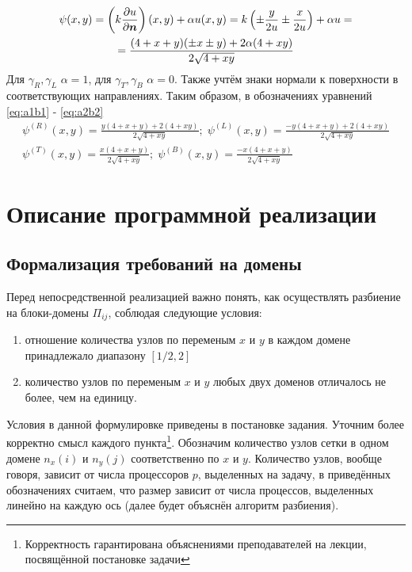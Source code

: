 \documentclass[12pt, fleqn]{article}
\theoremstyle{definition}
\def\vec#1{\mathchoice{\mbox{\boldmath$\displaystyle#1$}}
{\mbox{\boldmath$\textstyle#1$}} {\mbox{\boldmath$\scriptstyle#1$}} {\mbox{\boldmath$\scriptscriptstyle#1$}}}
\begin{document}
\begin{gather*}
 \psi(x, y) = \left(k\frac{\partial u}{\partial \vec{n}}\right)(x, y) + \alpha u(x, y) = k\left(\pm \frac{y}{2u} \pm \frac{x}{2u}\right) + \alpha u = \\
 = \frac{(4+x+y)(\pm x \pm y) + 2\alpha(4+xy)}{2\sqrt{4 + xy}}
\end{gather*}
Для $\gamma_R, \gamma_L$ $\alpha=1$, для $\gamma_T, \gamma_B$ $\alpha=0$. Также учтём знаки нормали к поверхности в соответствующих направлениях.
Таким образом, в обозначениях уравнений \ref{eq:a1b1} - \ref{eq:a2b2}
\begin{gather}
 \psi^{(R)}(x, y) = \frac{y(4+x+y) + 2(4+xy)}{2\sqrt{4 + xy}}; \; \psi^{(L)}(x, y) = \frac{-y(4+x+y) + 2(4+xy)}{2\sqrt{4 + xy}}  \label{eq:psi_RL} \\
 \psi^{(T)}(x, y) = \frac{x(4+x+y)}{2\sqrt{4 + xy}};\;
\psi^{(B)}(x, y) = \frac{-x(4+x+y)}{2\sqrt{4 + xy}}\label{eq:psi_TB}
\end{gather}

\section{Описание программной реализации}
\subsection{Формализация требований на домены}
Перед непосредственной реализацией важно понять, как осуществлять разбиение на блоки-домены $\Pi_{ij}$, соблюдая следующие условия:
\begin{enumerate}
 \item отношение количества узлов по переменым $x$ и $y$ в каждом домене принадлежало диапазону $[1 / 2,2]$

 \item количество узлов по переменым $x$ и $y$ любых двух доменов отличалось не более, чем на единицу.
\end{enumerate}

Условия в данной формулировке приведены в постановке задания. Уточним более корректно смысл каждого пункта\footnote{Корректность гарантирована объяснениями преподавателей на лекции, посвящённой постановке задачи}.
Обозначим количество узлов сетки в одном домене $n_x(i)$ и $n_y(j)$ соответственно по $x$ и $y$. Количество узлов, вообще говоря, зависит от числа процессоров $p$, выделенных на задачу, в приведённых обозначениях считаем, что размер зависит от числа процессов, выделенных линейно на каждую ось (далее будет объяснён алгоритм разбиения).
\end{document}
